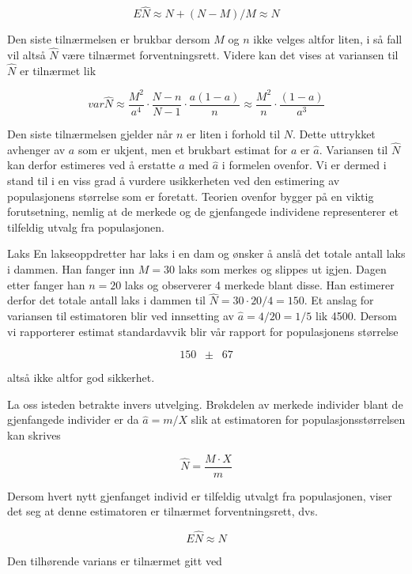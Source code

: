 \[   E\hat{N} \approx N+(N-M)/M \approx N \]

\noindent Den siste tilnærmelsen er brukbar dersom $M$ og $n$ ikke velges
altfor liten, i så fall vil altså $\hat{N}$ være tilnærmet
forventningsrett.  Videre kan det vises at variansen til $\hat{N}$ er
tilnærmet lik

\[   var\hat{N} \approx \frac{M^2}{a^4} \cdot \frac{N-n}{N-1} \cdot
         \frac{a(1-a)}{n} \approx \frac{M^2}{n} \cdot  \frac{(1-a)}{a^3} \]

\noindent Den siste tilnærmelsen gjelder når $n$ er liten i forhold
til $N$. Dette uttrykket avhenger av $a$ som er ukjent, men et brukbart
estimat for $a$ er $\hat{a}$.  Variansen til $\hat{N}$ kan derfor estimeres
ved å erstatte $a$ med $\hat{a}$ i formelen ovenfor.  Vi er dermed i stand 
til i en viss grad å vurdere usikkerheten ved den esti\-mering av
populasjonens størrelse som er foretatt.  Teorien ovenfor bygger på en
viktig forutsetning, nemlig at de merkede og de gjenfangede individene
representerer et tilfeldig utvalg fra populasjonen.\\

\begin{eksempel}{Laks}
En lakseoppdretter har laks i en dam og ønsker å anslå det totale
antall laks i dammen.  Han fanger inn $M = 30$ laks som merkes og slippes ut
igjen.  Dagen etter fanger han $n = 20$ laks og observerer 4 merkede blant
disse.  Han estimerer derfor det totale antall laks i dammen til $\hat{N} =
30\cdot 20/4 = 150$.  Et anslag for variansen til estimatoren blir ved
innsetting av $\hat{a} = 4/20 = 1/5$ lik 4500.  Dersom vi rapporterer
estimat standardavvik blir vår rapport for populasjonens størrelse

\[  150 \; \; \pm \; \; 67   \]

\noindent altså ikke altfor god sikkerhet.
\end{eksempel}

La oss isteden betrakte invers utvelging.  Brøkdelen av merkede individer
blant de gjenfangede individer er da $\hat{a} = m/X$ slik at estimatoren
for populasjonsstørrelsen kan skrives

\[  \hat{N}=\frac{M \cdot X}{m}    \]

\noindent Dersom hvert nytt gjenfanget individ er tilfeldig utvalgt fra
populasjonen, viser det seg at denne estimatoren er tilnærmet
forventningsrett, dvs.

\[  E\hat{N} \approx N      \]

\noindent Den tilhørende varians er tilnærmet gitt ved

